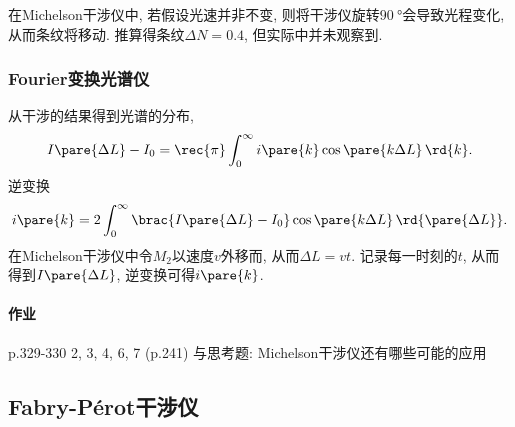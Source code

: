 \documentclass{ctexart}
\begin{document}
\begin{sample}
    \begin{ex}
        在Michelson干涉仪中, 若假设光速并非不变, 则将干涉仪旋转$\SI{90}{\degree}$会导致光程变化, 从而条纹将移动. 推算得条纹$\Delta N = 0.4$, 但实际中并未观察到.
    \end{ex}
\end{sample}

\subsubsection{Fourier变换光谱仪} %
\label{ssub:fourier变换光谱仪}

从干涉的结果得到光谱的分布,
\[ I\pare{\Delta L} - I_0 = \rec{\pi} \int_0^\infty i\pare{k}\cos\pare{k\Delta L}\,\rd{k}. \]
逆变换
\[ i\pare{k} = 2\int_0^\infty \brac{I\pare{\Delta L} - I_0}\cos\pare{k\Delta L}\,\rd{\pare{\Delta L}}. \]
在Michelson干涉仪中令$M_2$以速度$v$外移而, 从而$\Delta L = vt$. 记录每一时刻的$t$, 从而得到$I\pare{\Delta L}$, 逆变换可得$i\pare{k}$.

\paragraph{作业} %
\label{par:作业}

p.329-330 2, 3, 4, 6, 7 (p.241) 与思考题: Michelson干涉仪还有哪些可能的应用




\subsection{Fabry-P\texorpdfstring{\'e}{e}rot干涉仪} %
\label{sub:fabry_perot干涉仪}
\end{document}
